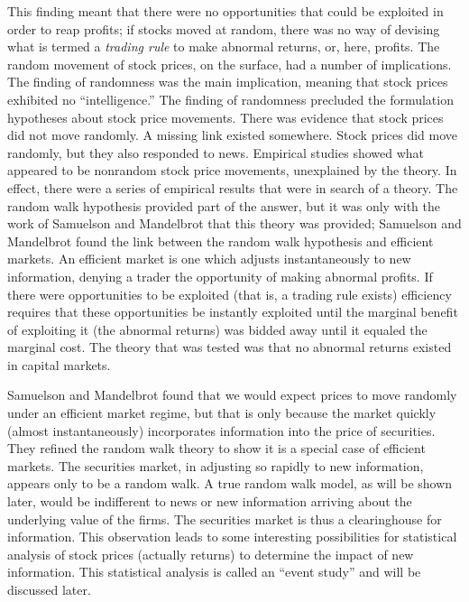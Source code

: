 This finding meant that there were no opportunities that could be
exploited in order to reap profits; if stocks moved at
random, there was no way of devising what is termed a {\em
trading rule} to make abnormal returns, or, here, profits.
The random movement of stock
prices, on the surface, had a number of implications.  The
finding of randomness was the main implication, meaning that stock
prices exhibited no ``intelligence.''
The finding of randomness
precluded the formulation hypotheses about stock price movements.
There was evidence that stock
prices did not move randomly.   A missing link existed somewhere.
Stock prices did move randomly, but they also responded to
news.  Empirical studies showed what appeared to be
nonrandom stock price movements, unexplained by the theory.  In
effect, there
were a series of empirical results that were in search of a theory.
The random walk hypothesis provided part of the answer, but
it was only with the work of Samuelson \cite{samuelson} and
Mandelbrot
\cite{mandelbrot} that this theory was provided; Samuelson and
Mandelbrot
found the link between the random walk hypothesis and
efficient markets.  An efficient market is one which adjusts
instantaneously to new information, denying a trader the
opportunity of making abnormal profits.
If there were
opportunities to be exploited (that is, a trading rule
exists) efficiency requires that these opportunities be instantly
exploited
until the marginal benefit of exploiting it (the abnormal
returns) was bidded away until it equaled the marginal cost.
The theory that was tested was that no
abnormal returns existed in capital markets.


Samuelson and Mandelbrot found
that we would expect prices to move randomly under an
efficient market regime, but that is only because
the market quickly (almost instantaneously) incorporates
information
into the price of securities.  They refined the random walk
theory to show it is a special case of efficient markets.
The securities market, in adjusting so rapidly to new
information, appears only to be a random walk.  A true
random walk model, as will be shown later, would be
indifferent to news or new information arriving about the
underlying value of the firms.
The securities market is thus a clearinghouse for
information.  This observation leads to some interesting
possibilities
for statistical analysis of stock prices (actually returns)
to determine the impact of new information.  This
statistical analysis is called an ``event study'' and will be
discussed later. 

